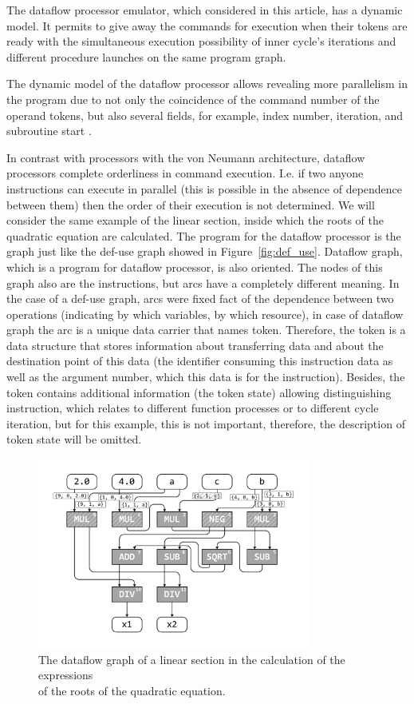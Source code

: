 \documentclass[
11pt,%
tightenlines,%
twoside,%
onecolumn,%
nofloats,%
nobibnotes,%
nofootinbib,%
superscriptaddress,%
noshowpacs,%
centertags]%
{revtex4}
\begin{document}
The dataflow processor emulator, which considered in this article, has a dynamic model.
It permits to give away the commands for execution when their tokens are ready with the simultaneous execution possibility of inner cycle’s iterations and different procedure launches on the same program graph.

The dynamic model of the dataflow processor allows revealing more parallelism in the program due to not only the coincidence of the command number of the operand tokens, but also several fields, for example, index number, iteration, and subroutine start \cite{Wiley}.

In contrast with processors with the von Neumann architecture, dataflow processors complete orderliness in command execution.
I.e. if two anyone instructions can execute in parallel (this is possible in the absence of dependence between them) then the order of their execution is not determined.
We will consider the same example of the linear section, inside which the roots of the quadratic equation are calculated.
The program for the dataflow processor is the graph just like the def-use graph showed in Figure~\ref{fig:def_use}.
Dataflow graph, which is a program for dataflow processor, is also oriented.
The nodes of this graph also are the instructions, but arcs have a completely different meaning.
In the case of a def-use graph, arcs were fixed fact of the dependence between two operations (indicating by which variables, by which resource), in case of dataflow graph the arc is a unique data carrier that names token.
Therefore, the token is a data structure that stores information about transferring data and about the destination point of this data (the identifier consuming this instruction data as well as the argument number, which this data is for the instruction).
Besides, the token contains additional information (the token state) allowing distinguishing instruction, which relates to different function processes or to different cycle iteration, but for this example, this is not important, therefore, the description of token state will be omitted.

\begin{figure}[h]
\setcaptionmargin{5mm}
\onelinecaptionsfalse %
\includegraphics[width=0.80\textwidth]{pics/dataflow.pdf}
\caption{The dataflow graph of a linear section in the calculation of the expressions \\ of the roots of the quadratic equation.}\label{fig:dataflow}
\end{figure}
\end{document}

